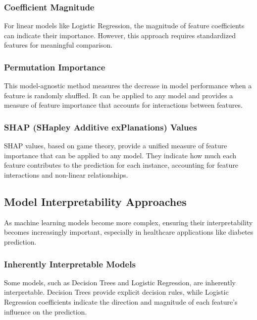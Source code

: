 \documentclass[journal]{IEEEtran}
\begin{document}
\subsubsection{Coefficient Magnitude}
For linear models like Logistic Regression, the magnitude of feature coefficients can indicate their importance. However, this approach requires standardized features for meaningful comparison.

\subsubsection{Permutation Importance}
This model-agnostic method measures the decrease in model performance when a feature is randomly shuffled. It can be applied to any model and provides a measure of feature importance that accounts for interactions between features.

\subsubsection{SHAP (SHapley Additive exPlanations) Values}
SHAP values, based on game theory, provide a unified measure of feature importance that can be applied to any model. They indicate how much each feature contributes to the prediction for each instance, accounting for feature interactions and non-linear relationships.

\subsection{Model Interpretability Approaches}
As machine learning models become more complex, ensuring their interpretability becomes increasingly important, especially in healthcare applications like diabetes prediction.

\subsubsection{Inherently Interpretable Models}
Some models, such as Decision Trees and Logistic Regression, are inherently interpretable. Decision Trees provide explicit decision rules, while Logistic Regression coefficients indicate the direction and magnitude of each feature's influence on the prediction.
\end{document}
